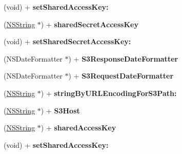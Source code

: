 \begin{DoxyCompactItemize}
\item 
\hypertarget{interface_a_s_i_s3_request_ad944a2a1b20fc9e4559c8faf4f41b977}{
(void) + {\bfseries set\-Shared\-Access\-Key\-:}}
\label{interface_a_s_i_s3_request_ad944a2a1b20fc9e4559c8faf4f41b977}

\item 
\hypertarget{interface_a_s_i_s3_request_af1a72a1aacc05ce3f5def339d3bfbd5f}{
(\hyperlink{class_n_s_string}{\-N\-S\-String} $\ast$) + {\bfseries shared\-Secret\-Access\-Key}}
\label{interface_a_s_i_s3_request_af1a72a1aacc05ce3f5def339d3bfbd5f}

\item 
\hypertarget{interface_a_s_i_s3_request_aca8ba2305c0cbee1d7ec8553831768ff}{
(void) + {\bfseries set\-Shared\-Secret\-Access\-Key\-:}}
\label{interface_a_s_i_s3_request_aca8ba2305c0cbee1d7ec8553831768ff}

\item 
\hypertarget{interface_a_s_i_s3_request_ac0d60115b59954ffcc2e293c60321a74}{
(\-N\-S\-Date\-Formatter $\ast$) + {\bfseries \-S3\-Response\-Date\-Formatter}}
\label{interface_a_s_i_s3_request_ac0d60115b59954ffcc2e293c60321a74}

\item 
\hypertarget{interface_a_s_i_s3_request_ac2da1def71701c5ed345a2e119dad803}{
(\-N\-S\-Date\-Formatter $\ast$) + {\bfseries \-S3\-Request\-Date\-Formatter}}
\label{interface_a_s_i_s3_request_ac2da1def71701c5ed345a2e119dad803}

\item 
\hypertarget{interface_a_s_i_s3_request_aab8bdd9f5d8970a3bcfca36ec9dee9fb}{
(\hyperlink{class_n_s_string}{\-N\-S\-String} $\ast$) + {\bfseries string\-By\-U\-R\-L\-Encoding\-For\-S3\-Path\-:}}
\label{interface_a_s_i_s3_request_aab8bdd9f5d8970a3bcfca36ec9dee9fb}

\item 
\hypertarget{interface_a_s_i_s3_request_ae49e83f64fb2490185d0a9ff3649e1d3}{
(\hyperlink{class_n_s_string}{\-N\-S\-String} $\ast$) + {\bfseries \-S3\-Host}}
\label{interface_a_s_i_s3_request_ae49e83f64fb2490185d0a9ff3649e1d3}

\item 
\hypertarget{interface_a_s_i_s3_request_aadbf1f29ab30efc3f4640bac7b508d32}{
(\hyperlink{class_n_s_string}{\-N\-S\-String} $\ast$) + {\bfseries shared\-Access\-Key}}
\label{interface_a_s_i_s3_request_aadbf1f29ab30efc3f4640bac7b508d32}

\item 
\hypertarget{interface_a_s_i_s3_request_ad944a2a1b20fc9e4559c8faf4f41b977}{
(void) + {\bfseries set\-Shared\-Access\-Key\-:}}
\label{interface_a_s_i_s3_request_ad944a2a1b20fc9e4559c8faf4f41b977}


\end{DoxyCompactItemize}
